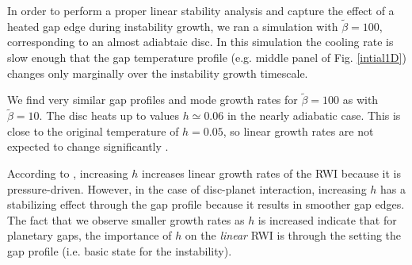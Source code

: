 In order to perform a proper linear stability analysis and capture the
effect of a heated gap edge during instability growth, we ran a simulation  with
$\tilde{\beta}=100$, corresponding to an almost adiabtaic disc.  
In this simulation the cooling rate is slow enough that the gap 
temperature profile (e.g. middle panel of Fig. \ref{intial1D}) changes
only marginally over the instability growth timescale. %

We find very similar gap profiles and mode growth rates for
$\tilde{\beta}=100$ as with $\tilde{\beta}=10$. The disc heats up to
values $h\simeq0.06$ in the nearly adiabatic case. This is close to
the original temperature of $h=0.05$, so linear growth rates are not expected
to change significantly %
\citep{li00}. 

According to \cite{li00}, increasing $h$ increases linear growth rates
of the RWI because it is pressure-driven. However, in the case 
of disc-planet interaction, increasing $h$ has a stabilizing effect
through the gap profile because it results in smoother gap
edges. The fact that we observe smaller growth rates as $h$ is
increased indicate that for planetary gaps, the importance of $h$ on
the \emph{linear} RWI is through the setting the gap profile (i.e. basic
state for the instability). 










